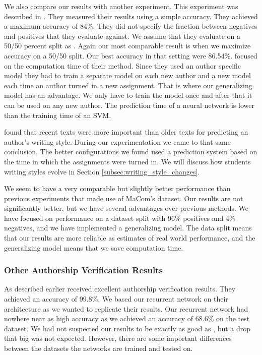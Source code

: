 We also compare our results with another experiment. This experiment was
described in \citep{hansen2014}. They measured their results using a simple
accuracy. They achieved a maximum accuracy of 84\%. They did not specify the
fraction between negatives and positives that they evaluate against. We assume
that they evaluate on a 50/50 percent split as \citet{aalykke2016}. Again our
most comparable result is when we maximize accuracy on a 50/50 split. Our
best accuracy in that setting were 86.54\%. \citet{hansen2014} focused on the
computation time of their method. Since they used an author specific model they
had to train a separate model on each new author and a new model each time an
author turned in a new assignment. That is where our generalizing model has an
advantage. We only have to train the model once and after that it can be used
on any new author. The prediction time of a neural network is lower than the
training time of an \gls{SVM}.

\citet{hansen2014} found that recent texts were more important than older
texts for predicting an author's writing style. During our experimentation
we came to that same conclusion. The better configurations we found
used a prediction system based on the time in which the assignments were
turned in. We will discuss how students writing styles evolve in Section
\ref{subsec:writing_style_changes}.

We seem to have a very comparable but slightly better performance than previous
experiments that made use of MaCom's dataset. Our results are not significantly
better, but we have several advantages over previous methods. We have focused
on performance on a dataset split with 96\% positives and 4\% negatives, and we
have implemented a generalizing model. The data split means that our results are
more reliable as estimates of real world performance, and the generalizing model
means that we save computation time.


\subsubsection{Other Authorship Verification Results}
\label{subsubsec:other_authorship_verification_results}

As described earlier \citet{qian:2018} received excellent authorship
verification results. They achieved an accuracy of 99.8\%. We based our
recurrent network on their architecture as we wanted to replicate their results.
Our recurrent network had nowhere near as high accuracy as we achieved an
accuracy of 68.6\% on the test dataset. We had not suspected our results to be
exactly as good as \citet{qian:2018}, but a drop that big was not expected.
However, there are some important differences between the datasets the networks
are trained and tested on.

